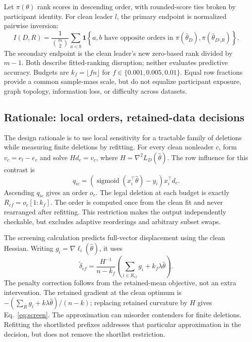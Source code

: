 \documentclass{article}
\newcommand{\sigmoid}{\operatorname{sigmoid}}
\begin{document}
Let $\pi(\theta)$ rank scores in descending order, with rounded-score ties broken by participant identity. For clean leader $l$, the primary endpoint is normalized pairwise inversion:
\begin{equation}
 I(D,R)=\frac{1}{\binom m2}\sum_{a<b}
 \mathbf{1}\!\left\{a,b\text{ have opposite orders in }
       \pi(\widehat\theta_D),\pi(\widehat\theta_{D\setminus R})\right\}.
 \label{eq:inversions}
\end{equation}
The secondary endpoint is the clean leader's new zero-based rank divided by $m-1$. Both describe fitted-ranking disruption; neither evaluates predictive accuracy. Budgets are $k_f=\lfloor fn\rfloor$ for $f\in\{0.001,0.005,0.01\}$. Equal row fractions provide a common sample-mass scale, but do not equalize participant exposure, graph topology, information loss, or difficulty across datasets.

\subsection{Rationale: local orders, retained-data decisions}
The design rationale is to use local sensitivity for a tractable family of deletions while measuring finite deletions by refitting. For every clean nonleader $c$, form $v_c=e_l-e_c$ and solve $Hd_c=v_c$, where $H=\nabla^2 L_D(\widehat\theta)$. The row influence for this contrast is
\begin{equation}
 q_{ic}=(\sigmoid(x_i^\top\widehat\theta)-y_i)x_i^\top d_c.
 \label{eq:influence}
\end{equation}
Ascending $q_{ic}$ gives an order $o_c$. The legal deletion at each budget is exactly $R_{cf}=o_c[1:k_f]$. The order is computed once from the clean fit and never rearranged after refitting. This restriction makes the output independently checkable, but excludes adaptive reorderings and arbitrary subset swaps.

The screening calculation predicts full-vector displacement using the clean Hessian. Writing $g_i=\nabla\ell_i(\widehat\theta)$, it uses
\begin{equation}
 \widetilde\delta_{cf}=\frac{H^{-1}}{n-k_f}
       \left(\sum_{i\in R_{cf}}g_i+k_f\lambda\widehat\theta\right).
 \label{eq:screen}
\end{equation}
The penalty correction follows from the retained-mean objective, not an extra intervention. The retained gradient at the clean optimum is $-(\sum_{R}g_i+k\lambda\widehat\theta)/(n-k)$; replacing retained curvature by $H$ gives Eq.~\ref{eq:screen}. The approximation can misorder contenders for finite deletions. Refitting the shortlisted prefixes addresses that particular approximation in the decision, but does not remove the shortlist restriction.
\end{document}
